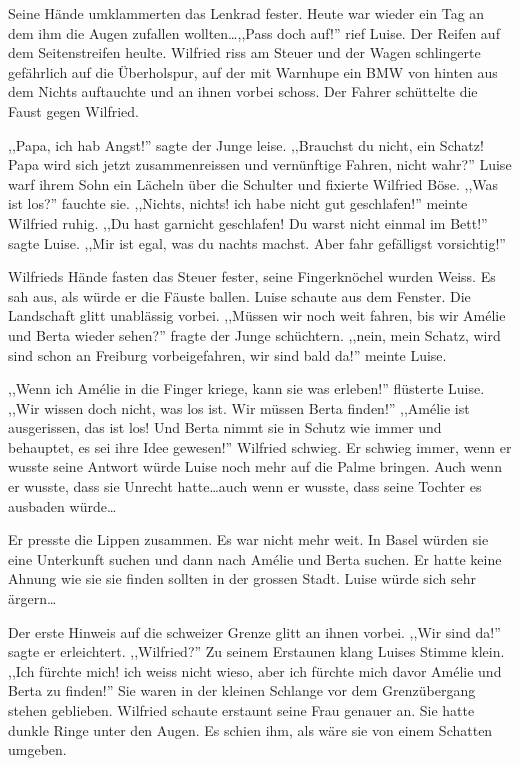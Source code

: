 \documentclass[11pt,titlepage,a5paper]{book}
\newcommand{\am}{Amélie }
\begin{document}
Seine Hände umklammerten das Lenkrad fester. Heute war wieder ein Tag an dem ihm die Augen zufallen wollten\dots ,,Pass doch auf!'' rief Luise. Der Reifen auf dem Seitenstreifen heulte. Wilfried riss am Steuer und der Wagen schlingerte gefährlich auf die Überholspur, auf der mit Warnhupe ein BMW von hinten aus dem Nichts auftauchte und an ihnen vorbei schoss. Der Fahrer schüttelte die Faust gegen Wilfried. 

,,Papa, ich hab Angst!'' sagte der Junge leise. ,,Brauchst du nicht, ein Schatz! Papa wird sich jetzt zusammenreissen und vernünftige Fahren, nicht wahr?'' Luise warf ihrem Sohn ein Lächeln über die Schulter und fixierte Wilfried Böse. ,,Was ist los?'' fauchte sie. ,,Nichts, nichts! ich habe nicht gut geschlafen!'' meinte Wilfried ruhig. ,,Du hast garnicht geschlafen! Du warst nicht einmal im Bett!'' sagte Luise. ,,Mir ist egal, was du nachts machst. Aber fahr gefälligst vorsichtig!''

Wilfrieds Hände fasten das Steuer fester, seine Fingerknöchel wurden Weiss. Es sah aus, als würde er die Fäuste ballen. Luise schaute aus dem Fenster. Die Landschaft glitt unablässig vorbei. ,,Müssen wir noch weit fahren, bis wir \am und Berta wieder sehen?'' fragte der Junge schüchtern. ,,nein, mein Schatz, wird sind schon an Freiburg vorbeigefahren, wir sind bald da!'' meinte Luise.

,,Wenn ich \am in die Finger kriege, kann sie was erleben!'' flüsterte Luise. ,,Wir wissen doch nicht, was los ist. Wir müssen Berta finden!'' ,,\am ist ausgerissen, das ist los! Und Berta nimmt sie in Schutz wie immer und behauptet, es sei ihre Idee gewesen!'' Wilfried schwieg. Er schwieg immer, wenn er wusste seine Antwort würde Luise noch mehr auf die Palme bringen. Auch wenn er wusste, dass sie Unrecht hatte\dots auch wenn er wusste, dass seine Tochter es ausbaden würde\dots 

Er presste die Lippen zusammen. Es war nicht mehr weit. In Basel würden sie eine Unterkunft suchen und dann nach \am und Berta suchen. Er hatte keine Ahnung wie sie sie finden sollten in der grossen Stadt. Luise würde sich sehr ärgern\dots 

Der erste Hinweis auf die schweizer Grenze glitt an ihnen vorbei. ,,Wir sind da!'' sagte er erleichtert. ,,Wilfried?'' Zu seinem Erstaunen klang Luises Stimme klein. ,,Ich fürchte mich! ich weiss nicht wieso, aber ich fürchte mich davor \am und Berta zu finden!'' Sie waren in der kleinen Schlange vor dem Grenzübergang stehen geblieben. Wilfried schaute erstaunt seine Frau genauer an. Sie hatte dunkle Ringe unter den Augen. Es schien ihm, als wäre sie von einem Schatten umgeben.
\end{document}
